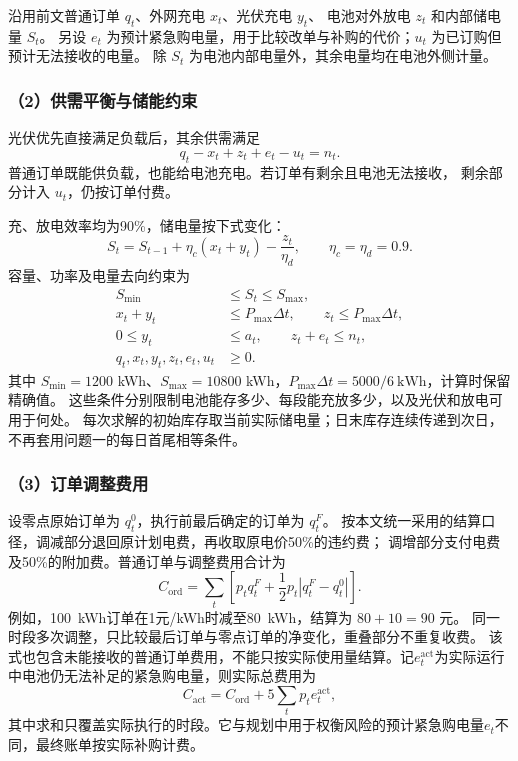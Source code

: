 沿用前文普通订单 $q_t$、外网充电 $x_t$、光伏充电 $y_t$、
电池对外放电 $z_t$ 和内部储电量 $S_t$。
另设 $e_t$ 为预计紧急购电量，用于比较改单与补购的代价；$u_t$ 为已订购但预计无法接收的电量。
除 $S_t$ 为电池内部电量外，其余电量均在电池外侧计量。

\subsubsection*{（2）供需平衡与储能约束}

光伏优先直接满足负载后，其余供需满足
\begin{equation}
q_t-x_t+z_t+e_t-u_t=n_t.
\end{equation}
普通订单既能供负载，也能给电池充电。若订单有剩余且电池无法接收，
剩余部分计入 $u_t$，仍按订单付费。

充、放电效率均为90\%，储电量按下式变化：
\begin{equation}
S_t=S_{t-1}+\eta_c(x_t+y_t)-\frac{z_t}{\eta_d},\qquad \eta_c=\eta_d=0.9.
\end{equation}
容量、功率及电量去向约束为
\begin{equation}
\begin{aligned}
S_{\min}&\leq S_t\leq S_{\max},\\
x_t+y_t&\leq P_{\max}\Delta t,\qquad z_t\leq P_{\max}\Delta t,\\
0\leq y_t&\leq a_t,\qquad z_t+e_t\leq n_t,\\
q_t,x_t,y_t,z_t,e_t,u_t&\geq0.
\end{aligned}
\end{equation}
其中 $S_{\min}=1200$ kWh、$S_{\max}=10800$ kWh，$P_{\max}\Delta t=5000/6\ \mathrm{kWh}$，计算时保留精确值。
这些条件分别限制电池能存多少、每段能充放多少，以及光伏和放电可用于何处。
每次求解的初始库存取当前实际储电量；日末库存连续传递到次日，
不再套用问题一的每日首尾相等条件。

\subsubsection*{（3）订单调整费用}

设零点原始订单为 $q_t^0$，执行前最后确定的订单为 $q_t^F$。
按本文统一采用的结算口径，调减部分退回原计划电费，再收取原电价50\%的违约费；
调增部分支付电费及50\%的附加费。普通订单与调整费用合计为
\begin{equation}
C_{\mathrm{ord}}=\sum_t\left[p_tq_t^F+\frac12p_t|q_t^F-q_t^0|\right].
\end{equation}
例如，100~kWh订单在1元/kWh时减至80~kWh，结算为 $80+10=90$ 元。
同一时段多次调整，只比较最后订单与零点订单的净变化，重叠部分不重复收费。
该式也包含未能接收的普通订单费用，不能只按实际使用量结算。记$e_t^{\mathrm{act}}$为实际运行中电池仍无法补足的紧急购电量，则实际总费用为
\[
C_{\mathrm{act}}=C_{\mathrm{ord}}+5\sum_t p_t e_t^{\mathrm{act}},
\]
其中求和只覆盖实际执行的时段。它与规划中用于权衡风险的预计紧急购电量$e_t$不同，最终账单按实际补购计费。

